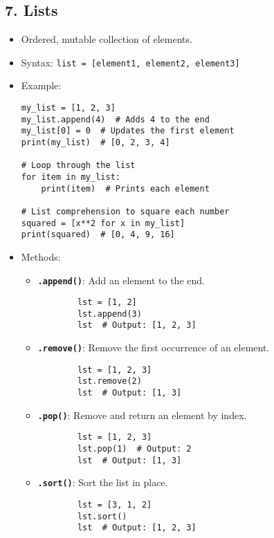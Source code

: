 \subsection*{7. Lists}
\begin{itemize}
    \item Ordered, mutable collection of elements.
    \item Syntax: \texttt{list = [element1, element2, element3]}
    \item Example:
    \begin{verbatim}
my_list = [1, 2, 3]
my_list.append(4)  # Adds 4 to the end
my_list[0] = 0  # Updates the first element
print(my_list)  # [0, 2, 3, 4]

# Loop through the list
for item in my_list:
    print(item)  # Prints each element

# List comprehension to square each number
squared = [x**2 for x in my_list]
print(squared)  # [0, 4, 9, 16]
    \end{verbatim}
    \item Methods:
    \begin{itemize}
        \item \textbf{\texttt{.append()}}: Add an element to the end.
        \begin{verbatim}
        lst = [1, 2]
        lst.append(3)
        lst  # Output: [1, 2, 3]
        \end{verbatim}
        \item \textbf{\texttt{.remove()}}: Remove the first occurrence of an element.
        \begin{verbatim}
        lst = [1, 2, 3]
        lst.remove(2)
        lst  # Output: [1, 3]
        \end{verbatim}
        \item \textbf{\texttt{.pop()}}: Remove and return an element by index.
        \begin{verbatim}
        lst = [1, 2, 3]
        lst.pop(1)  # Output: 2
        lst  # Output: [1, 3]
        \end{verbatim}
        \item \textbf{\texttt{.sort()}}: Sort the list in place.
        \begin{verbatim}
        lst = [3, 1, 2]
        lst.sort()
        lst  # Output: [1, 2, 3]
        \end{verbatim}
    \end{itemize}
\end{itemize}

